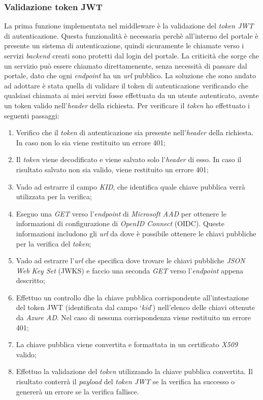 \subsubsection{Validazione token JWT}
La prima funzione implementata nel middleware è la validazione del \textit{token JWT} di autenticazione. Questa funzionalità è necessaria perchè all'interno del portale è presente un sistema di autenticazione, quindi sicuramente le chiamate verso i servizi \textit{backend} creati sono protetti dal login del portale.
La criticità che sorge che un servizio può essere chiamato direttamenente, senza necessità di passare dal portale, dato che ogni \textit{endpoint} ha un \textit{url} pubblico.
La soluzione che sono andato ad adottare è stata quella di validare il token di autenticazione verificando che qualsiasi chiamata ai miei servizi fosse effettuata da un utente autenticato, avente un token valido nell'\textit{header} della richiesta.
Per verificare il \textit{token} ho effettuato i seguenti passaggi:
\begin{enumerate}
  \item Verifico che il \textit{token} di autenticazione sia presente nell'\textit{header} della richiesta. In caso non lo sia viene restituito un errore 401;
  \item Il \textit{token} viene decodificato e viene salvato solo l'\textit{header} di esso. In caso il risultato salvato non sia valido, viene restituito un errore 401;
  \item Vado ad estrarre il campo \textit{KID}, che identifica quale chiave pubblica verrà utilizzata per la verifica;
  \item Eseguo una \textit{GET} verso l'\textit{endpoint} di \textit{Microsoft AAD} per ottenere le informazioni di configurazione di \textit{OpenID Connect} (OIDC). 
  Queste informazioni includono gli \textit{url} da dove è possibile ottenere le chiavi pubbliche per la verifica del \textit{token};
  \item Vado ad estrarre l'\textit{url} che specifica dove trovare le chiavi pubbliche \textit{JSON Web Key Set} (JWKS) e faccio una seconda \textit{GET} verso l'\textit{endpoint} appena descritto;
  \item Effettuo un controllo dhe la chiave pubblica corrispondente all'intestazione del token JWT (identificata dal campo `\textit{kid}') nell'elenco delle chiavi ottenute da \textit{Azure AD}. Nel caso di nessuna corrispondenza viene restituito un errore 401;
  \item La chiave pubblica viene convertita e formattata in un certificato \textit{X509} valido;
  \item Effettuo la validazione del \textit{token} utilizzando la chiave pubblica convertita. Il risultato conterrà il \textit{payload} del \textit{token JWT} se la verifica ha successo o genererà un errore se la verifica fallisce.
\end{enumerate}

